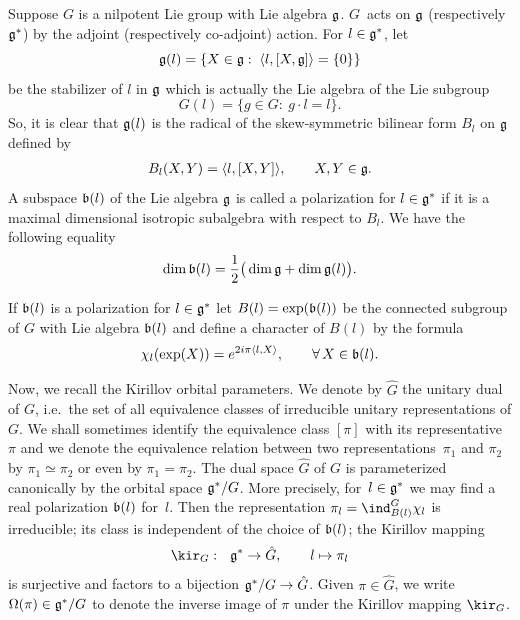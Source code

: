 Suppose $G$ is a nilpotent Lie group with Lie algebra $\frak g$. $G$~acts on $\frak g$ (respectively $\frak g^*$) by the adjoint
(respectively co-adjoint) action. For $l\in \frak g^*$, let
\[
\frak
g(l) = \{X\in \frak g:\; \langle l, [X, \frak g]\rangle = \{0\}\}
\]
be the stabilizer of $l$ in $\frak g$ which is actually the Lie
algebra of the Lie subgroup
\[
G(l) = \{g\in G:\ g\cdot l = l\}.
\]
So, it is clear that $\frak g(l)$ is the radical of the
skew-symmetric bilinear form $B_l$ on $\frak g$ def\/ined by
\begin{gather*}%
B_l(X, Y) = \langle l, [X, Y]\rangle,\qquad X, Y \in \frak g.
\end{gather*}
A subspace $\frak b(l)$ of the Lie algebra $\frak g$ is called a
polarization for $l\in \frak g^*$ if it is a maximal dimensional
isotropic subalgebra with respect to $B_l$. We have the following
equality
\begin{gather}\label{dim-pilarisation}
\dim{\frak b(l)}=\dfrac{1}{2} \big(\dim{\frak g}+\dim{\frak
g(l)}\big).
\end{gather}

If $\frak b(l)$ is a polarization for $l\in \frak g^*$ let
$B(l)=\exp(\frak b(l))$ be the connected subgroup of $G$ with Lie
algebra $\frak b(l)$ and def\/ine a character of $B(l)$ by the formula
\begin{gather*}%
\chi_l(\exp(X))= e^{2i \pi \langle l, X\rangle},\qquad \forall\, X\in \frak b(l).
\end{gather*}



Now, we recall the Kirillov orbital parameters. We denote by $\hat
G$ the unitary dual of $G$, i.e.\ the set of all equivalence classes
of irreducible unitary representations of $G$. We shall sometimes
identify the equivalence class $[\pi]$ with its representative $\pi$
and we denote the equivalence relation between two representations~$\pi_1$ and $\pi_2$ by $\pi_1 \simeq \pi_2$ or even by $\pi_1 =
\pi_2$.  The dual space $\hat G$ of $G$ is parameterized canonically
by the orbital space $\frak g^*/G$. More precisely, for~$l \in \frak
g^*$ we may f\/ind a real polarization $\frak b(l)$ for~$l$.
 Then the representation $\pi_l =
\ind_{B(l)}^G \chi_l$ is irreducible; its class is independent of
the choice of $\frak b(l)$; the Kirillov mapping
\begin{gather*}
\kir_G:  \ \ \frak g^* \rightarrow \hat G,\qquad  l \mapsto\pi_l
\end{gather*}
 is surjective and factors to a
bijection $\frak g^*/G \rightarrow \hat G$. Given $\pi \in \hat G$, we write $\Omega(\pi) \in \frak g^*/G$ to denote the inverse
image of $\pi$ under the Kirillov mapping $\kir_G$.


